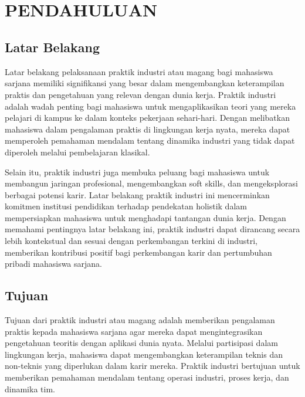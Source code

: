 
\chapter[PENDAHULUAN]{\\ PENDAHULUAN}

\section{Latar Belakang}
Latar belakang pelaksanaan praktik industri atau magang bagi mahasiswa sarjana memiliki signifikansi yang besar dalam mengembangkan keterampilan praktis dan pengetahuan yang relevan dengan dunia kerja. Praktik industri adalah wadah penting bagi mahasiswa untuk mengaplikasikan teori yang mereka pelajari di kampus ke dalam konteks pekerjaan sehari-hari. Dengan melibatkan mahasiswa dalam pengalaman praktis di lingkungan kerja nyata, mereka dapat memperoleh pemahaman mendalam tentang dinamika industri yang tidak dapat diperoleh melalui pembelajaran klasikal.

Selain itu, praktik industri juga membuka peluang bagi mahasiswa untuk membangun jaringan profesional, mengembangkan soft skills, dan mengeksplorasi berbagai potensi karir. Latar belakang praktik industri ini mencerminkan komitmen institusi pendidikan terhadap pendekatan holistik dalam mempersiapkan mahasiswa untuk menghadapi tantangan dunia kerja. Dengan memahami pentingnya latar belakang ini, praktik industri dapat dirancang secara lebih kontekstual dan sesuai dengan perkembangan terkini di industri, memberikan kontribusi positif bagi perkembangan karir dan pertumbuhan pribadi mahasiswa sarjana.

\section{Tujuan \tipe}
Tujuan dari praktik industri atau magang adalah memberikan pengalaman praktis kepada mahasiswa sarjana agar mereka dapat mengintegrasikan pengetahuan teoritis dengan aplikasi dunia nyata. Melalui partisipasi dalam lingkungan kerja, mahasiswa dapat mengembangkan keterampilan teknis dan non-teknis yang diperlukan dalam karir mereka. Praktik industri bertujuan untuk memberikan pemahaman mendalam tentang operasi industri, proses kerja, dan dinamika tim.


